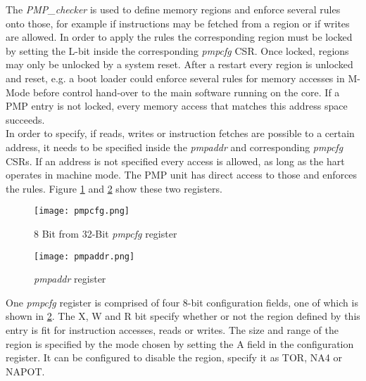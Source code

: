 The \textit{PMP\_checker} is used to define memory regions and enforce several rules onto
those, for example if instructions may be fetched from a region or if writes are
allowed. In order to apply the rules the corresponding region must be locked by
setting the L-bit inside the corresponding \textit{pmpcfg} \ac{CSR}. Once locked, regions may only be unlocked by a system reset. After a restart every region is unlocked and
reset, e.g. a boot loader could enforce several rules for memory accesses in M-Mode before control hand-over to the main software running on the core. If a \ac{PMP} entry is not locked, every memory access that matches this address space succeeds.
\\
In order to specify, if reads, writes or instruction fetches are possible to a certain address, it needs to be specified inside the \textit{pmpaddr} and corresponding \textit{pmpcfg} CSRs. If an address is not specified every access is allowed, as long as the hart operates in machine mode. The PMP unit has direct access to those and enforces the rules. Figure \ref{fig:pmpaddr} and \ref{fig:pmpcfg} show these two registers.\\

\begin{figure}[H]
	\centering
	\texttt{[image: pmpcfg.png]}
	\caption{8 Bit from 32-Bit \textit{pmpcfg} register \cite{riscv:privileged}}
	\label{fig:pmpaddr}
\end{figure}


\begin{figure}[H]
	\centering
	\texttt{[image: pmpaddr.png]}
	\caption{\textit{pmpaddr} register \cite{riscv:privileged}}
	\label{fig:pmpcfg}
\end{figure}

One \textit{pmpcfg} register is comprised of four 8-bit configuration fields, one of which is shown in \ref{fig:pmpcfg}. The X, W and R bit specify whether or not the region defined by this entry is fit for instruction accesses, reads or writes. The size and range of the region is specified by the mode chosen by setting the A field in the configuration register. It can be configured to disable the region, specify it as \ac{TOR}, \ac{NA4} or \ac{NAPOT}. 

